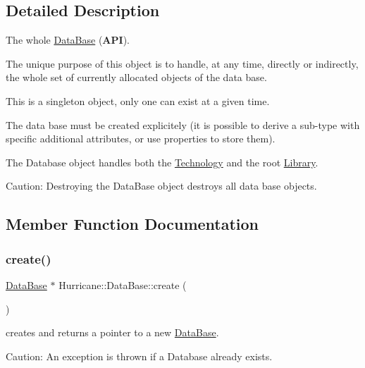 \subsection{Detailed Description}
The whole \mbox{\hyperlink{classHurricane_1_1DataBase}{Data\+Base}} ({\bfseries A\+PI}). 

The unique purpose of this object is to handle, at any time, directly or indirectly, the whole set of currently allocated objects of the data base.

This is a singleton object, only one can exist at a given time.

The data base must be created explicitely (it is possible to derive a sub-\/type with specific additional attributes, or use properties to store them).

The Database object handles both the \mbox{\hyperlink{classHurricane_1_1Technology}{Technology}} and the root \mbox{\hyperlink{classHurricane_1_1Library}{Library}}.

\begin{DoxyParagraph}{Caution\+: Destroying the Data\+Base object destroys all data base objects.}

\end{DoxyParagraph}


\subsection{Member Function Documentation}
\mbox{\label{classHurricane_1_1DataBase_af0210f9bb13faf06e12eb135eeea9b06}} 
\subsubsection{\texorpdfstring{create()}{create()}}
{\footnotesize\ttfamily \mbox{\hyperlink{classHurricane_1_1DataBase}{Data\+Base}} $\ast$ Hurricane\+::\+Data\+Base\+::create (\begin{DoxyParamCaption}{ }\end{DoxyParamCaption})\hspace{0.3cm}{\ttfamily [static]}}

creates and returns a pointer to a new \mbox{\hyperlink{classHurricane_1_1DataBase}{Data\+Base}}.

\begin{DoxyParagraph}{Caution\+: An exception is thrown if a Database already exists.}

\end{DoxyParagraph}
\mbox{\label{classHurricane_1_1DataBase_a144480c54b0f9fbda57622ad6767ab8a}} 
